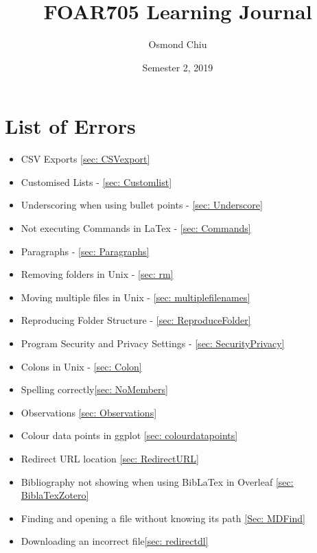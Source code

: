\documentclass{article}
\title{FOAR705 Learning Journal}
\author{Osmond Chiu}
\date{Semester 2, 2019}
\begin{document}
\maketitle
\tableofcontents
 
\newpage



\section{List of Errors}\par
\begin{itemize}
    \item CSV Exports \ref{sec: CSVexport}
    \item Customised Lists - \ref{sec: Customlist}
    \item Underscoring when using bullet points - \ref{sec: Underscore}
    \item Not executing Commands in LaTex - \ref{sec: Commands}
    \item Paragraphs - \ref{sec: Paragraphs}\par
    \item Removing folders in Unix - \ref{sec: rm}\par
    \item Moving multiple files in Unix - \ref{sec: multiplefilenames}\par
    \item Reproducing Folder Structure - \ref{sec: ReproduceFolder}
    \item Program Security and Privacy Settings - \ref{sec: SecurityPrivacy}
    \item Colons in Unix - \ref{sec: Colon}
    \item Spelling correctly\ref{sec: NoMembers}
    \item Observations \ref{sec: Observations}
    \item Colour data points in ggplot \ref{sec: colourdatapoints}
    \item Redirect URL location \ref{sec: RedirectURL}
    \item Bibliography not showing when using BibLaTex in Overleaf \ref{sec: BiblaTexZotero}
    \item Finding and opening a file without knowing its path \ref{Sec: MDFind}
    \item Downloading an incorrect file\ref{sec: redirectdl}
\end{itemize}



\par
\end{document}

